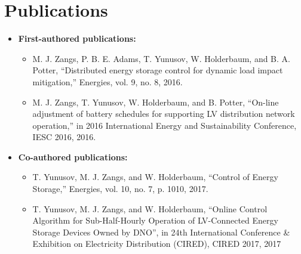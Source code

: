 \section{Publications}
\label{ch-introduction:sec:publications}


\begin{itemize}

\item \textbf{First-authored publications:}
\begin{itemize}
	\item M. J. Zangs, P. B. E. Adams, T. Yunusov, W. Holderbaum, and B. A. Potter, ``Distributed energy storage control for dynamic load impact mitigation,'' Energies, vol. 9, no. 8, 2016.
	\item M. J. Zangs, T. Yunusov, W. Holderbaum, and B. Potter, ``On-line adjustment of battery schedules for supporting LV distribution network operation,'' in 2016 International Energy and Sustainability Conference, IESC 2016, 2016.
\end{itemize}

\item \textbf{Co-authored publications:}
\begin{itemize}
	\item T. Yunusov, M. J. Zangs, and W. Holderbaum, ``Control of Energy Storage,'' Energies, vol. 10, no. 7, p. 1010, 2017.
	\item T. Yunusov, M. J. Zangs, and W. Holderbaum, ``Online Control Algorithm for Sub-Half-Hourly Operation of LV-Connected Energy Storage Devices Owned by DNO'', in 24th International Conference \& Exhibition on Electricity Distribution (CIRED), CIRED 2017, 2017
\end{itemize}


\end{itemize}




